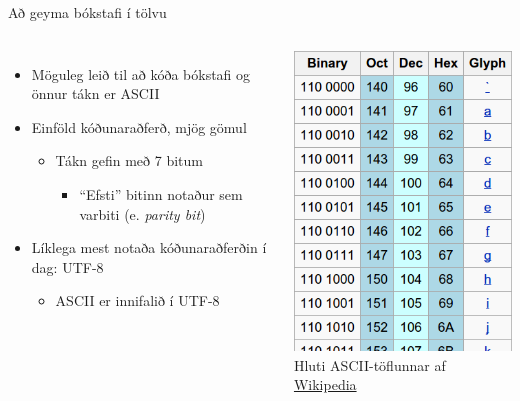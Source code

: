 \documentclass{beamer}
\begin{document}
\begin{frame}{Að geyma bókstafi í tölvu}
\begin{columns}
\begin{itemize}
 \item Möguleg leið til að kóða bókstafi og önnur tákn er ASCII
 \item Einföld kóðunaraðferð, mjög gömul
 \begin{itemize}
  \item Tákn gefin með 7 bitum
  \begin{itemize}
   \item ``Efsti'' bitinn notaður sem varbiti (e. \emph{parity bit})
  \end{itemize}
 \end{itemize}
 \item Líklega mest notaða kóðunaraðferðin í dag: UTF-8
 \begin{itemize}
  \item ASCII er innifalið í UTF-8
 \end{itemize}
\end{itemize}
\includegraphics[width=\linewidth]{Pics/ascii-table}
\\Hluti ASCII-töflunnar af \href{https://en.wikipedia.org/wiki/ASCII}{Wikipedia}
\end{columns}
\end{frame}
\end{document}
